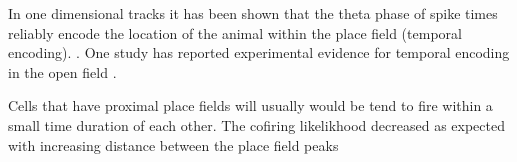 In one dimensional tracks it has been shown that the theta phase of spike times reliably encode the location of the animal within the place field (temporal encoding). \cite{O'Keefe1993, Skaggs1996c, Huxter2003}. One study has reported experimental evidence for temporal encoding in the open field \cite{Huxter2008a}. 




Cells that have proximal place fields will usually would be tend to fire within a small time duration of each other. The cofiring likelikhood decreased as expected with increasing distance between the place field peaks \\

